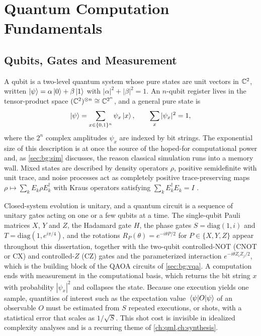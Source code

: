 \section{Quantum Computation Fundamentals}\label{sec:bg:qc}

\subsection{Qubits, Gates and Measurement}

A qubit is a two-level quantum system whose pure states are unit vectors in $\mathbb{C}^2$, written $\ket{\psi}=\alpha\ket{0}+\beta\ket{1}$ with $|\alpha|^2+|\beta|^2=1$. An $n$-qubit register lives in the tensor-product space $(\mathbb{C}^2)^{\otimes n}\cong\mathbb{C}^{2^n}$, and a general pure state is
\begin{equation}\label{eq:bg:statevector}
\ket{\psi}=\sum_{x\in\{0,1\}^n}\psi_x\ket{x},\qquad \sum_{x}|\psi_x|^2=1,
\end{equation}
where the $2^n$ complex amplitudes $\psi_x$ are indexed by bit strings. The exponential size of this description is at once the source of the hoped-for computational power and, as \cref{sec:bg:sim} discusses, the reason classical simulation runs into a memory wall. Mixed states are described by density operators $\rho$, positive semidefinite with unit trace, and noise processes act as completely positive trace-preserving maps $\rho\mapsto\sum_k E_k\rho E_k^\dagger$ with Kraus operators satisfying $\sum_k E_k^\dagger E_k=I$ \cite{nielsen2010qcqi}.

Closed-system evolution is unitary, and a quantum circuit is a sequence of unitary gates acting on one or a few qubits at a time. The single-qubit Pauli matrices $X$, $Y$ and $Z$, the Hadamard gate $H$, the phase gates $S=\mathrm{diag}(1,i)$ and $T=\mathrm{diag}(1,e^{i\pi/4})$, and the rotations $R_P(\theta)=e^{-i\theta P/2}$ for $P\in\{X,Y,Z\}$ appear throughout this dissertation, together with the two-qubit controlled-NOT (CNOT or CX) and controlled-$Z$ (CZ) gates and the parameterized interaction $e^{-i\theta Z_iZ_j/2}$, which is the building block of the QAOA circuits of \cref{sec:bg:vqa}. A computation ends with measurement in the computational basis, which returns the bit string $x$ with probability $|\psi_x|^2$ and collapses the state. Because one execution yields one sample, quantities of interest such as the expectation value $\expval{O}{\psi}$ of an observable $O$ must be estimated from $S$ repeated executions, or shots, with a statistical error that scales as $1/\sqrt{S}$. This shot cost is invisible in idealized complexity analyses and is a recurring theme of \cref{ch:qml,ch:synthesis}.


